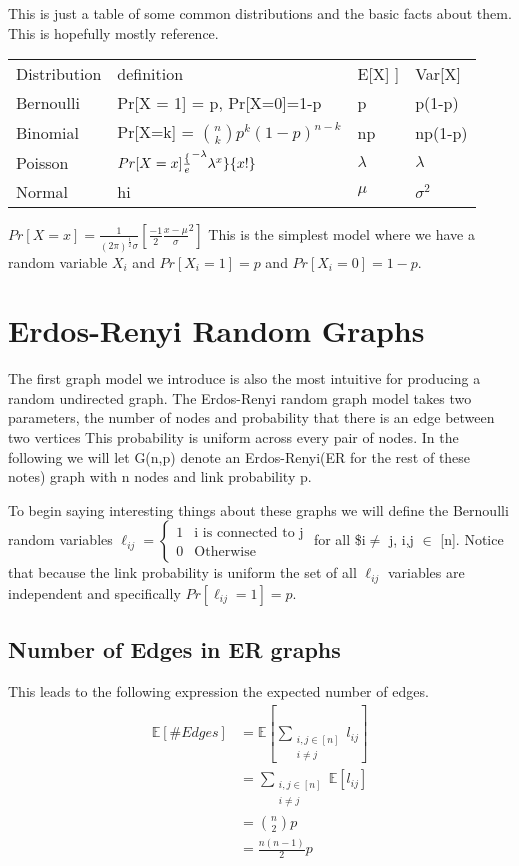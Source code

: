 \documentclass[11pt]{article}
\newcommand\ssum[1]{\sum_{\substack{#1}}}
\newcommand\E{\mathbb{E}}
\begin{document}
This is just a table of some common distributions and the basic facts about them. This is hopefully mostly reference.
\begin{center}
\begin{tabular}{llll}
Distribution & definition & E[X] ] & Var[X]\\
Bernoulli & Pr[X = 1] = p, Pr[X=0]=1-p & p & p(1-p)\\
Binomial & Pr[X=k]  = $\binom{n}{k} p^{k} (1-p)^{n-k}$ & np & np(1-p)\\
Poisson & $ Pr[X=x] \frac\{e^{- \lambda } \lambda^{x}\}\{x!\}$ &  $ \lambda $ & \(\lambda\)\\
Normal & hi &  $\mu$  & $\sigma^{2}$ \\
\end{tabular}
\end{center}
$Pr[X=x] =  \frac{1}{ (2 \pi)^{\frac{1}{2}} \sigma } \left[ \frac{-1}{2} \frac{x -\mu}{\sigma}^{2} \right]$
This is the simplest model where we have a random variable \(X_{i}\) and \(Pr[X_{i} = 1] = p\) and \(Pr[X_{i} = 0] = 1-p\).

\section{Erdos-Renyi Random Graphs}
\label{sec:org41189dd}
The first graph model we introduce is also the most intuitive for producing a random undirected graph.  The Erdos-Renyi random graph model takes two parameters, the number of nodes and probability that there is an edge between two vertices This probability is uniform across every pair of nodes. In the following we will let G(n,p) denote an Erdos-Renyi(ER for the rest of these notes) graph with n nodes and link probability p.


To begin saying interesting things about these graphs we will define the Bernoulli random variables \(\ell_{ij} = \begin{cases} 1 & \text{i is connected to j} \\ 0 & \text{Otherwise} \end{cases}\) for all \$i\(\neq\) j, i,j \(\in\) [n]. Notice that because the link probability is uniform the set of all \(\ell_{ij}\) variables are independent and specifically \(Pr[\ell_{ij} = 1] = p\).

\subsection{Number of Edges in ER graphs}
\label{sec:org20d0931}
This leads to the following expression the expected number of edges.
\begin{align}
    \E[\# Edges] &= \E[\sum_{\substack{i,j \in [n] \\ i\neq j}} l_{ij}  ] \\
                 &= \ssum{ i,j \in [n] \\ i\neq j } \E [l_{ij}] \\
    &= \binom{n}{2} p \\
    &= \frac{n(n-1)}{2} p
\end{align}
\end{document}
